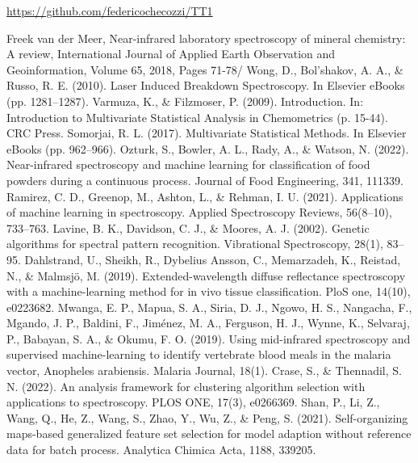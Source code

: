 \documentclass[12pt]{article}
\begin{document}
\url{https://github.com/federicochecozzi/TT1}

\begin{thebibliography}{0}
    Freek van der Meer, Near-infrared laboratory spectroscopy of mineral chemistry: A review, International Journal of Applied Earth Observation and Geoinformation, Volume 65, 2018, Pages 71-78/
    Wong, D., Bol’shakov, A. A., \& Russo, R. E. (2010). Laser Induced Breakdown Spectroscopy. In Elsevier eBooks (pp. 1281–1287). 
    Varmuza, K., \& Filzmoser, P. (2009). Introduction. In: Introduction to Multivariate Statistical Analysis in Chemometrics (p. 15-44). CRC Press.
    Somorjai, R. L. (2017). Multivariate Statistical Methods. In Elsevier eBooks (pp. 962–966). 
    Ozturk, S., Bowler, A. L., Rady, A., \& Watson, N. (2022). Near-infrared spectroscopy and machine learning for classification of food powders during a continuous process. Journal of Food Engineering, 341, 111339. 
    Ramirez, C. D., Greenop, M., Ashton, L., \& Rehman, I. U. (2021). Applications of machine learning in spectroscopy. Applied Spectroscopy Reviews, 56(8–10), 733–763.
     Lavine, B. K., Davidson, C. J., \& Moores, A. J. (2002). Genetic algorithms for spectral pattern recognition. Vibrational Spectroscopy, 28(1), 83–95. 
    Dahlstrand, U., Sheikh, R., Dybelius Ansson, C., Memarzadeh, K., Reistad, N., \& Malmsjö, M. (2019). Extended-wavelength diffuse reflectance spectroscopy with a machine-learning method for in vivo tissue classification. PloS one, 14(10), e0223682. 
    Mwanga, E. P., Mapua, S. A., Siria, D. J., Ngowo, H. S., Nangacha, F., Mgando, J. P., Baldini, F., Jiménez, M. A., Ferguson, H. J., Wynne, K., Selvaraj, P., Babayan, S. A., \& Okumu, F. O. (2019). Using mid-infrared spectroscopy and supervised machine-learning to identify vertebrate blood meals in the malaria vector, Anopheles arabiensis. Malaria Journal, 18(1). 
     Crase, S., \& Thennadil, S. N. (2022). An analysis framework for clustering algorithm selection with applications to spectroscopy. PLOS ONE, 17(3), e0266369. 
     Shan, P., Li, Z., Wang, Q., He, Z., Wang, S., Zhao, Y., Wu, Z., \& Peng, S. (2021). Self-organizing maps-based generalized feature set selection for model adaption without reference data for batch process. Analytica Chimica Acta, 1188, 339205. 

\end{thebibliography}
\end{document}
